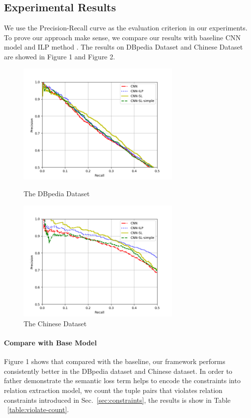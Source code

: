 \subsection{Experimental Results}
We use the Precision-Recall curve as the evaluation criterion in our experiments. To prove our approach make sense, we compare our results with baseline CNN model \cite{lin2016neural} and ILP method \cite{chen2014encoding}. The results on DBpedia Dataset and Chinese Dataset are showed in Figure 1 and Figure 2.
\begin{figure}[htbp]
	\centering
	\begin{minipage}[t]{0.48\textwidth}
		\centering
		\includegraphics[width=8cm]{./result-figure/DBpedia-CNN-result.png}
		\caption{The DBpedia Dataset}
	\end{minipage}
	\begin{minipage}[t]{0.48\textwidth}
		\centering
		\includegraphics[width=8cm]{./result-figure/Chinese-CNN-result.png}
		\caption{The Chinese Dataset}
	\end{minipage}
\end{figure}

\paragraph{Compare with Base Model}
Figure 1 shows that compared with the baseline, our framework performs consistently better in the DBpedia dataset and Chinese dataset. In order to father demonstrate the semantic loss term helps to encode the constraints into relation extraction model, we count the tuple pairs that violates relation constraints introduced in Sec.~\ref{sec:constraints}, the results is show in Table ~\ref{table:violate-count}.

